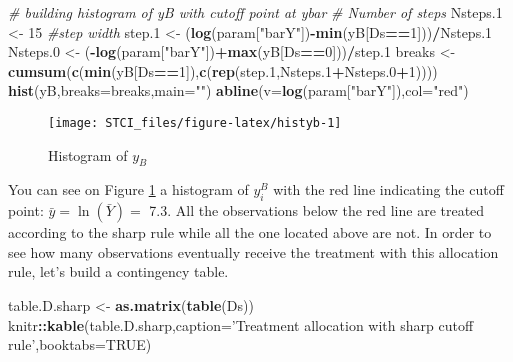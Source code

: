 \documentclass[]{book}
\newenvironment{Shaded}{\begin{snugshade}}{\end{snugshade}}
\newcommand{\KeywordTok}[1]{\textcolor[rgb]{0.13,0.29,0.53}{\textbf{#1}}}
\newcommand{\DataTypeTok}[1]{\textcolor[rgb]{0.13,0.29,0.53}{#1}}
\newcommand{\DecValTok}[1]{\textcolor[rgb]{0.00,0.00,0.81}{#1}}
\newcommand{\StringTok}[1]{\textcolor[rgb]{0.31,0.60,0.02}{#1}}
\newcommand{\CommentTok}[1]{\textcolor[rgb]{0.56,0.35,0.01}{\textit{#1}}}
\newcommand{\OtherTok}[1]{\textcolor[rgb]{0.56,0.35,0.01}{#1}}
\newcommand{\OperatorTok}[1]{\textcolor[rgb]{0.81,0.36,0.00}{\textbf{#1}}}
\newcommand{\NormalTok}[1]{#1}
\theoremstyle{definition}
\theoremstyle{definition}
\theoremstyle{definition}
\theoremstyle{remark}
\begin{document}
\begin{Shaded}
\begin{Highlighting}[]
\CommentTok{# building histogram of yB with cutoff point at ybar}
\CommentTok{# Number of steps}
\NormalTok{Nsteps.}\DecValTok{1}\NormalTok{ <-}\StringTok{ }\DecValTok{15}
\CommentTok{#step width}
\NormalTok{step.}\DecValTok{1}\NormalTok{ <-}\StringTok{ }\NormalTok{(}\KeywordTok{log}\NormalTok{(param[}\StringTok{"barY"}\NormalTok{])}\OperatorTok{-}\KeywordTok{min}\NormalTok{(yB[Ds}\OperatorTok{==}\DecValTok{1}\NormalTok{]))}\OperatorTok{/}\NormalTok{Nsteps.}\DecValTok{1}
\NormalTok{Nsteps.}\DecValTok{0}\NormalTok{ <-}\StringTok{ }\NormalTok{(}\OperatorTok{-}\KeywordTok{log}\NormalTok{(param[}\StringTok{"barY"}\NormalTok{])}\OperatorTok{+}\KeywordTok{max}\NormalTok{(yB[Ds}\OperatorTok{==}\DecValTok{0}\NormalTok{]))}\OperatorTok{/}\NormalTok{step.}\DecValTok{1}
\NormalTok{breaks <-}\StringTok{ }\KeywordTok{cumsum}\NormalTok{(}\KeywordTok{c}\NormalTok{(}\KeywordTok{min}\NormalTok{(yB[Ds}\OperatorTok{==}\DecValTok{1}\NormalTok{]),}\KeywordTok{c}\NormalTok{(}\KeywordTok{rep}\NormalTok{(step.}\DecValTok{1}\NormalTok{,Nsteps.}\DecValTok{1}\OperatorTok{+}\NormalTok{Nsteps.}\DecValTok{0}\OperatorTok{+}\DecValTok{1}\NormalTok{))))}
\KeywordTok{hist}\NormalTok{(yB,}\DataTypeTok{breaks=}\NormalTok{breaks,}\DataTypeTok{main=}\StringTok{""}\NormalTok{)}
\KeywordTok{abline}\NormalTok{(}\DataTypeTok{v=}\KeywordTok{log}\NormalTok{(param[}\StringTok{"barY"}\NormalTok{]),}\DataTypeTok{col=}\StringTok{"red"}\NormalTok{)}
\end{Highlighting}
\end{Shaded}

\begin{figure}

{\centering \texttt{[image: STCI\_files/figure-latex/histyb-1]} 

}

\caption{Histogram of $y_B$}\label{fig:histyb}
\end{figure}

You can see on Figure \ref{fig:histyb} a histogram of \(y_i^B\) with the
red line indicating the cutoff point: \(\bar{y}=\ln(\bar{Y})=\) 7.3. All
the observations below the red line are treated according to the sharp
rule while all the one located above are not. In order to see how many
observations eventually receive the treatment with this allocation rule,
let's build a contingency table.

\begin{Shaded}
\begin{Highlighting}[]
\NormalTok{table.D.sharp <-}\StringTok{ }\KeywordTok{as.matrix}\NormalTok{(}\KeywordTok{table}\NormalTok{(Ds))}
\NormalTok{knitr}\OperatorTok{::}\KeywordTok{kable}\NormalTok{(table.D.sharp,}\DataTypeTok{caption=}\StringTok{'Treatment allocation with sharp cutoff rule'}\NormalTok{,}\DataTypeTok{booktabs=}\OtherTok{TRUE}\NormalTok{)}
\end{Highlighting}
\end{Shaded}
\end{document}
